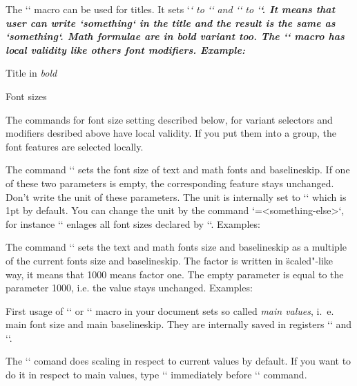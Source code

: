 \new
The `\boldify` macro can be used for titles. It sets `\it` to `\bi` and
`\rm` to `\bf`. It means that user can write `{\it something}` in the title
and the result is the same as `{\bi something}`. Math formulae are in bold 
variant too. The `\boldify` macro has local validity like others font 
modifiers. Example:

\begtt
{\boldify\typosize[14/16] Title in {\it bold}\par}
\endtt


\sec Font sizes

The commands for font size setting described below, for variant selectors and
modifiers desribed above have local validity. If you put them into a group, 
the font features are selected locally.

The command `` sets the font size of text and
math fonts and baselineskip. If one of these two parameters is empty, the
corresponding feature stays unchanged. Don't write the unit of these
parameters. The unit is internally set to `\ptunit` which is 1pt by default.
You can change the unit by the command `\ptunit=<something-else>`, 
for instance `\ptunit=1mm` enlages all font sizes declared by `\typosize`.
Examples:

\begtt
\typosize[10/12]   %
\typosize[11/12.5] %
\typosize[8/]      %
\endtt

The command
``
sets the text and math fonts
size and baselineskip as a multiple of the current fonts size and
baselineskip. The factor is written in \"scaled"-like way, it means that 1000
means factor one. The empty parameter is equal to the parameter 1000,
i.e. the value stays unchanged. Examples:

\begtt
\typoscale[800/800]    %
\typoscale[\magstep2/] %
\endtt

First usage of `\typosize` or `\typoscale` macro in your document sets so
called {\em main values}, i.\ e. main font size and main baselineskip. They are internally 
saved in registers `\mainfosize` and `\mainbaselineskip`. 

\new
The `\typoscale` comand does scaling in respect to current values by default. 
If you want to do it in respect to main values, type `\scalemain` immediately
before `\typoscale` command.

\begtt
\typosize[12/14.4] %
\typosize[15/18]   %
\scalemain \typoscale[800/800] %
\endtt

